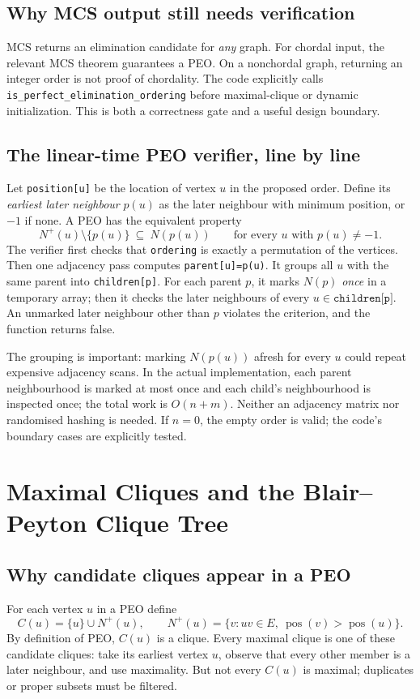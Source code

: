 \subsection{Why MCS output still needs verification}
MCS returns an elimination candidate for \emph{any} graph.  For chordal input, the relevant MCS theorem guarantees a PEO.  On a nonchordal graph, returning an integer order is not proof of chordality.  The code explicitly calls \texttt{is\_perfect\_elimination\_ordering} before maximal-clique or dynamic initialization.  This is both a correctness gate and a useful design boundary.

\subsection{The linear-time PEO verifier, line by line}
Let \texttt{position[u]} be the location of vertex \(u\) in the proposed order.  Define its \emph{earliest later neighbour} \(p(u)\) as the later neighbour with minimum position, or \(-1\) if none.  A PEO has the equivalent property
\[
 N^+(u)\setminus\{p(u)\}\ \subseteq\ N(p(u))
\qquad\text{for every }u\text{ with }p(u)\neq-1.
\]
The verifier first checks that \texttt{ordering} is exactly a permutation of the vertices.  Then one adjacency pass computes \texttt{parent[u]=p(u)}.  It groups all \(u\) with the same parent into \texttt{children[p]}.  For each parent \(p\), it marks \(N(p)\) \emph{once} in a temporary array; then it checks the later neighbours of every \(u\in\texttt{children[p]}\).  An unmarked later neighbour other than \(p\) violates the criterion, and the function returns false.

The grouping is important: marking \(N(p(u))\) afresh for every \(u\) could repeat expensive adjacency scans.  In the actual implementation, each parent neighbourhood is marked at most once and each child's neighbourhood is inspected once; the total work is \(O(n+m)\).  Neither an adjacency matrix nor randomised hashing is needed.  If \(n=0\), the empty order is valid; the code's boundary cases are explicitly tested.

\section{Maximal Cliques and the Blair--Peyton Clique Tree}
\label{sec:bp-detail}
\subsection{Why candidate cliques appear in a PEO}
For each vertex \(u\) in a PEO define
\[
 C(u)=\{u\}\cup N^+(u),\qquad N^+(u)=\{v:uv\in E,\ \operatorname{pos}(v)>\operatorname{pos}(u)\}.
\]
By definition of PEO, \(C(u)\) is a clique.  Every maximal clique is one of these candidate cliques: take its earliest vertex \(u\), observe that every other member is a later neighbour, and use maximality.  But not every \(C(u)\) is maximal; duplicates or proper subsets must be filtered.


